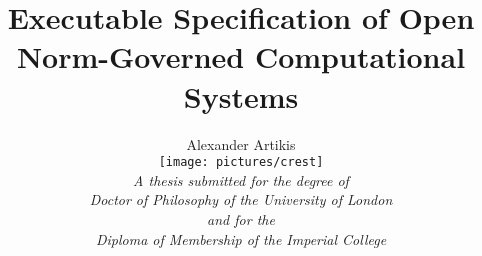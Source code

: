 \documentclass[10pt,a4paper]{report}
\begin{document}
\pagestyle{plain}

\setcounter{page}{0}

\title{\textbf\Huge {Executable Specification of Open \\ Norm-Governed Computational Systems}}   






\author{\Large Alexander Artikis\\[1.5in] \texttt{[image: pictures/crest]}\\[1in] \textsl{A thesis submitted for the degree of}\\ \textsl{Doctor of Philosophy of the University of London}\\ \textsl{and for the}\\ \textsl{Diploma of Membership of the Imperial College} }

\maketitle 





\setlength{\parindent}{0in}


\setlength{\parskip}{1.5ex}

\setlength{\itemsep}{0ex}

%


\setcounter{page}{1}





%



\clearpage

\vspace{3in}

\\[.3in]
\end{document}
